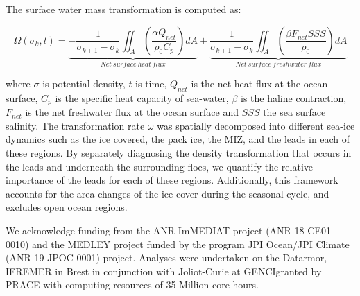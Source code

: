 \documentclass[lineno,sn-basic]{sn-jnl}%
\begin{document}
The surface water mass transformation is computed as:

\begin{equation}
    \Omega(\sigma_k,t) = \underbrace{- \frac{1}{\sigma_{k+1}-\sigma_k}\iint_A\left(\frac{\alpha Q_{net}}{\rho_0 C_p}\right)dA}_{Net\ surface\ heat\ flux} + \underbrace{\frac{1}{\sigma_{k+1}-\sigma_k}\iint_A\left(\frac{\beta F_{net} SSS }{\rho_0}\right)dA}_{Net\ surface\ freshwater\ flux}
\end{equation}

where $\sigma$ is potential density, $t$ is time, $Q_{net}$ is the net heat flux at the ocean surface, $C_p$ is the specific heat capacity of sea-water, $\beta$ is the haline contraction, $F_{net}$ is the net freshwater flux at the ocean surface and $SSS$ the sea surface salinity. The transformation rate $\omega$ was spatially decomposed into different sea-ice dynamics such as the ice covered, the pack ice, the MIZ, and the leads in each of these regions. 
By separately diagnosing the density transformation that occurs in the leads and underneath the surrounding floes, we quantify the relative importance of the leads for each of these regions. Additionally, this framework accounts for the area changes of the ice cover during the seasonal cycle, and excludes open ocean regions.

\backmatter



We acknowledge funding from the ANR ImMEDIAT project (ANR-18-CE01-0010) and the MEDLEY project funded by the program JPI Ocean/JPI Climate (ANR-19-JPOC-0001) project. Analyses were undertaken on the Datarmor, IFREMER in Brest in conjunction with Joliot-Curie at GENCI\makeatletter@CEA granted by PRACE with computing resources of 35 Million core hours.



\end{document}
